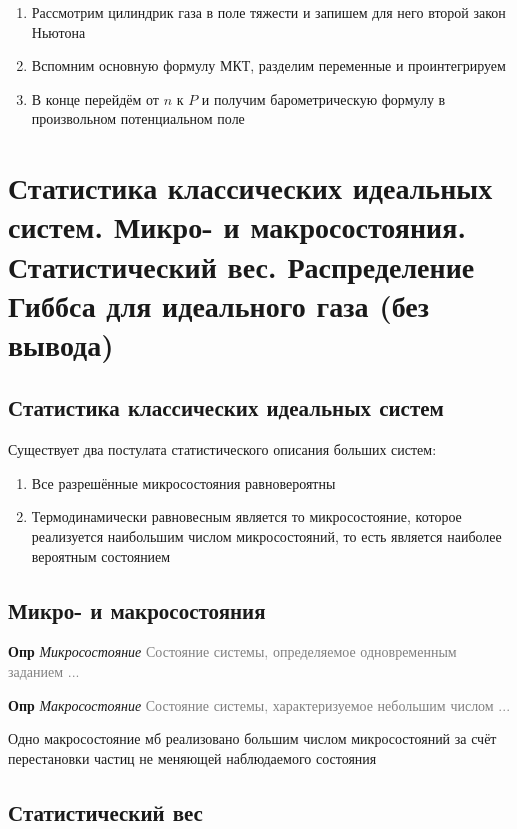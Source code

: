 \documentclass[a4paper, 14pt]{article}
\begin{document}
    \begin{enumerate}
        \item Рассмотрим цилиндрик газа в поле тяжести и запишем для него второй закон Ньютона
        \item Вспомним основную формулу МКТ, разделим переменные и проинтегрируем
        \item В конце перейдём от $n$ к $P$ и получим барометрическую формулу в произвольном потенциальном поле
    \end{enumerate}

    \section{Статистика классических идеальных систем.
    Микро- и макросостояния.
    Статистический вес.
    Распределение Гиббса для идеального газа (без вывода)}

    \subsection{Статистика классических идеальных систем}

    Существует два постулата статистического описания больших систем:

    \begin{enumerate}
        \item Все разрешённые микросостояния равновероятны
        \item Термодинамически равновесным является то микросостояние, которое реализуется наибольшим числом
        микросостояний, то есть является наиболее вероятным состоянием
    \end{enumerate}

    \subsection{Микро- и макросостояния}

    \textbf{Опр} \textit{Микросостояние} \textcolor{gray}{Состояние системы, определяемое одновременным заданием ...}

    \textbf{Опр} \textit{Макросостояние} \textcolor{gray}{Состояние системы, характеризуемое небольшим числом ...}

    Одно макросостояние мб реализовано большим числом микросостояний за счёт перестановки частиц не меняющей
    наблюдаемого состояния

    \subsection{Статистический вес}
\end{document}
